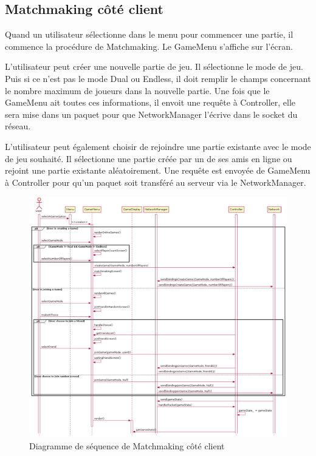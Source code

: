 \documentclass{article}
\begin{document}
\subsection{Matchmaking côté client}

Quand un utilisateur sélectionne dans le menu pour commencer une partie, il commence la procédure de Matchmaking. Le GameMenu s'affiche sur l'écran.

L'utilisateur peut créer une nouvelle partie de jeu. Il sélectionne le mode de jeu. Puis si ce n'est pas le mode Dual ou Endless, il doit remplir le champs concernant le nombre maximum de joueurs dans la nouvelle partie. Une fois que le GameMenu ait toutes ces informations, il envoit une requête à Controller, elle sera mise dans un paquet pour que NetworkManager l'écrive dans le socket du réseau. 

L'utilisateur peut également choisir de rejoindre une partie existante avec le mode de jeu souhaité. Il sélectionne une partie créée par un de ses amis en ligne ou rejoint une partie existante aléatoirement. Une requête est envoyée de GameMenu à Controller pour qu'un paquet soit transféré au serveur via le NetworkManager.

\begin{figure}[H]
    \centering
    \includegraphics[width=1\textwidth]{../../res/uml/sequence/MatchMakingClientSequence.png}
    \caption{Diagramme de séquence de Matchmaking côté client}
    \label{fig:MatchmakingClientDiagram}
\end{figure}
\end{document}
